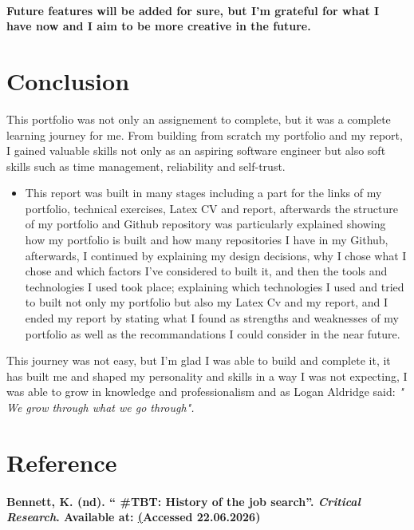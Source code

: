 \documentclass[12pt]{article}
\begin{document}
\paragraph{Future features will be added for sure, but I'm grateful for what I have now and I aim to be more creative in the future.}

 

 

\section{Conclusion}
This portfolio was not only an assignement to complete, but it was a complete learning journey for me. From building from scratch my portfolio and my report, I gained valuable skills not only as an aspiring software engineer but also soft skills such as time management, reliability and self-trust.

\begin{itemize}

\item {This report was built in many stages including a part for the links of my portfolio, technical exercises, Latex CV and report, afterwards the structure of my portfolio and Github repository was particularly explained showing how my portfolio is built and how many repositories I have in my Github, afterwards, I continued by explaining my design decisions, why I chose what I chose and which factors I've considered to built it, and then the tools and technologies I used took place; explaining which technologies I used and tried to built not only my portfolio but also my Latex Cv and my report, and I ended my report by stating what I found as strengths and weaknesses of my portfolio as well as the recommandations I could consider in the near future.}

\end{itemize}
{This journey was not easy, but I'm glad I was able to build and complete it, it has built me and shaped my personality and skills in a way I was not expecting, I was able to grow in knowledge and professionalism and as Logan Aldridge said: \textit{ " We grow through what we go through". }}

\newpage

\section{Reference}
\paragraph {Bennett, K. (nd). “ #TBT: History of the job search”. \textit{Critical Research}. Available at: \href{https://criticalresearch.com/technology/tbt-history-of-the-job-search/ }(Accessed  22.06.2026)}
\end{document}
